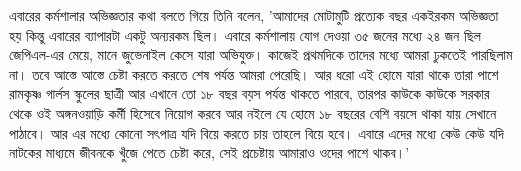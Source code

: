 \documentclass{article}
\begin{document}
\begin{minipage}[t]{102mm}
\begin{multicols}{2}
এবারের কর্মশালার অভিজ্ঞতার কথা বলতে গিয়ে তিনি বলেন, 'আমাদের মোটামুটি প্রত্যেক বছর একইরকম অভিজ্ঞতা হয় কিন্তু এবারের ব্যাপারটা একটু অন্যরকম ছিল। এবারে কর্মশালায় যোগ দেওয়া ৩৫ জনের মধ্যে ২৪ জন ছিল জেপিএল-এর মেয়ে, মানে জুভেনাইল কেসে যারা অভিযুক্ত। কাজেই প্রথমদিকে তাদের মধ্যে আমরা ঢুকতেই  পারছিলাম না। তবে আস্তে আস্তে চেষ্টা করতে করতে শেষ পর্যন্ত আমরা পেরেছি। আর ধরো এই হোমে যারা থাকে তারা পাশে রামকৃষ্ণ গার্লস স্কুলের ছাত্রী আর এখানে তো ১৮ বছর বয়স পর্যন্ত থাকতে পারবে, তারপর কাউকে কাউকে সরকার থেকে ওই অঙ্গনওয়াড়ি কর্মী হিসেবে নিয়োগ করবে আর নইলে যে হোমে ১৮ বছরের বেশি বয়সে থাকা যায় সেখানে পাঠাবে। আর এর মধ্যে কোনো সৎপাত্র যদি বিয়ে করতে চায় তাহলে বিয়ে হবে। এবারে এদের মধ্যে কেউ কেউ যদি নাটকের মাধ্যমে জীবনকে খুঁজে পেতে চেষ্টা করে, সেই প্রচেষ্টায় আমারাও ওদের পাশে থাকব।' 
\end{multicols}
%
\end{minipage}
%
\end{document}
